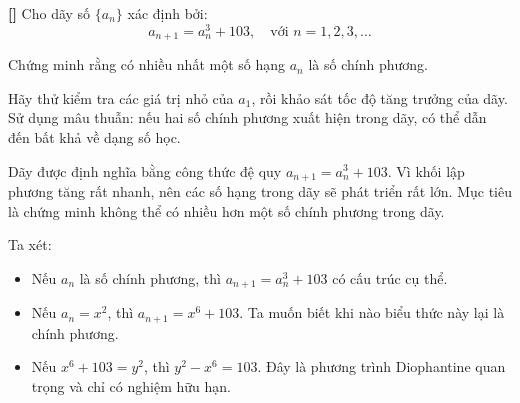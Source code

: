 \documentclass[../05-modular-arithmetic-a.tex]{subfiles}
\begin{document}
\begin{exercise*}\label{example:TWN-2015-TST2-Q2-P1}\textbf{[]}
    Cho dãy số \( \{a_n\} \) xác định bởi:
    \[
        a_{n+1} = a_n^3 + 103,\quad \text{với } n = 1, 2, 3, \dots
    \]
    
    Chứng minh rằng có nhiều nhất một số hạng \( a_n \) là số chính phương.    
\end{exercise*}

\begin{remark*}
    Hãy thử kiểm tra các giá trị nhỏ của \( a_1 \), rồi khảo sát tốc độ tăng trưởng của dãy. Sử dụng mâu thuẫn: nếu hai số chính phương xuất hiện trong dãy, có thể dẫn đến bất khả về dạng số học.
\end{remark*}

\begin{story*}
    Dãy được định nghĩa bằng công thức đệ quy \( a_{n+1} = a_n^3 + 103 \). Vì khối lập phương tăng rất nhanh, nên các số hạng trong dãy sẽ phát triển rất lớn. Mục tiêu là chứng minh không thể có nhiều hơn một số chính phương trong dãy.

    Ta xét:
    \begin{itemize}[topsep=0pt, partopsep=0pt, itemsep=0pt]
        \item Nếu \( a_n \) là số chính phương, thì \( a_{n+1} = a_n^3 + 103 \) có cấu trúc cụ thể.
        \item Nếu \( a_n = x^2 \), thì \( a_{n+1} = x^6 + 103 \). Ta muốn biết khi nào biểu thức này lại là chính phương.
        \item Nếu \( x^6 + 103 = y^2 \), thì \( y^2 - x^6 = 103 \). Đây là phương trình Diophantine quan trọng và chỉ có nghiệm hữu hạn.
    \end{itemize}
\end{story*}
\end{document}
